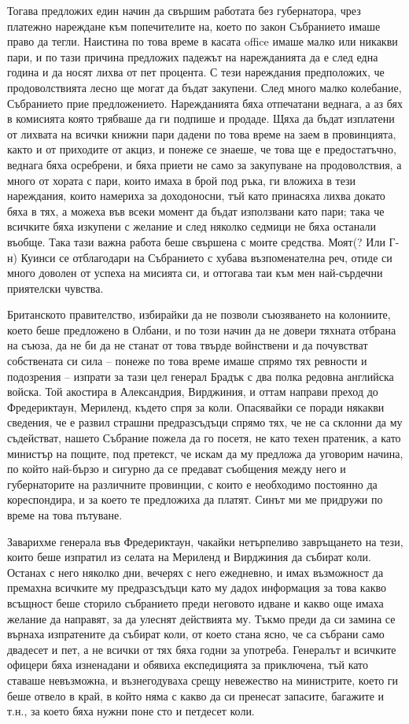 \documentclass[12pt]{book}
\begin{document}
Тогава предложих един начин да свършим работата без губернатора, чрез платежно нареждане към попечителите на, което по закон Събранието имаше право да тегли. Наистина по това време в касата office имаше малко или никакви пари, и по тази причина предложих падежът на нарежданията да е след една година и да носят лихва от пет процента. С тези нареждания предположих, че продоволствията лесно ще могат да бъдат закупени. След много малко колебание, Събранието прие предложението. Нарежданията бяха отпечатани веднага, а аз бях в комисията която трябваше да ги подпише и продаде. Щяха да бъдат изплатени от лихвата на всички книжни пари дадени по това време на заем в провинцията, както и от приходите от акциз, и понеже се знаеше, че това ще е предостатъчно, веднага бяха осребрени, и бяха приети не само за закупуване на продоволствия, а много от хората с пари, които имаха в брой под ръка, ги вложиха в тези нареждания, които намериха за доходоносни, тъй като принасяха лихва докато бяха в тях, а можеха във всеки момент да бъдат използвани като пари; така че всичките бяха изкупени с желание и след няколко седмици не бяха останали въобще. Така тази важна работа беше свършена с моите средства. Моят(? Или Г-н) Куинси се отблагодари на Събранието с хубава възпоменателна реч, отиде си много доволен от успеха на мисията си, и оттогава таи към мен най-сърдечни приятелски чувства.

Британското правителство, избирайки да не позволи съюзяването на колониите, което беше предложено в Олбани, и по този начин да не довери тяхната отбрана на съюза, да не би да не станат от това твърде войнствени  и да почувстват собствената си сила – понеже по това време имаше спрямо тях ревности и подозрения – изпрати за тази цел генерал Брадък с два полка редовна английска войска. Той акостира в Александрия, Вирджиния, и оттам направи преход до Фредериктаун, Мериленд, където спря за коли. Опасявайки се поради някакви сведения, че е развил страшни предразсъдъци спрямо тях, че не са склонни да му съдействат, нашето Събрание пожела да го посетя, не като техен пратеник, а като министър на пощите, под претекст, че искам да му предложа да уговорим начина, по който най-бързо и сигурно да се предават съобщения между него и губернаторите на различните провинции, с които е необходимо постоянно да кореспондира, и за което те предложиха да платят. Синът ми ме придружи по време на това пътуване.

Заварихме генерала във Фредериктаун, чакайки нетърпеливо завръщането на тези, които беше изпратил из селата на Мериленд и Вирджиния да събират коли. Останах с него няколко дни, вечерях с него ежедневно, и имах възможност да премахна всичките му предразсъдъци като му дадох информация за това какво всъщност беше сторило събранието преди неговото идване и какво още имаха желание  да направят, за да улеснят действията му. Тъкмо преди да си замина се върнаха изпратените да събират коли, от което стана ясно, че са събрани само двадесет и пет, а не всички от тях бяха годни за употреба. Генералът и всичките офицери бяха изненадани и обявиха експедицията за приключена, тъй като ставаше невъзможна, и възнегодуваха срещу невежество на министрите, което ги беше отвело в край, в който няма с какво да си пренесат запасите, багажите и т.н., за което бяха нужни поне сто и петдесет коли.
\end{document}
